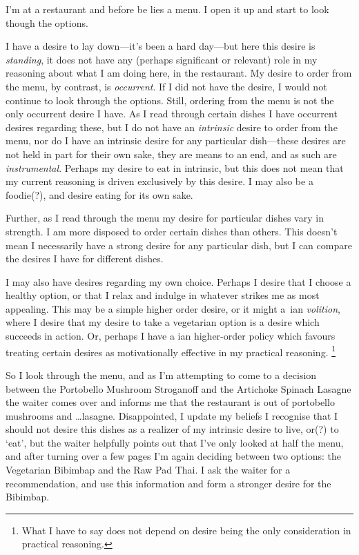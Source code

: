 \documentclass[10pt]{article}
\begin{document}
\begin{scenario}
  I'm at a restaurant and before be lies a menu. I open it up and start to look though the options.

  I have a desire to lay down---it's been a hard day---but here this desire is \emph{standing}, it does not have any (perhaps significant or relevant) role in my reasoning about what I am doing here, in the restaurant. My desire to order from the menu, by contrast, is \emph{occurrent}. If I did not have the desire, I would not continue to look through the options. Still, ordering from the menu is not the only occurrent desire I have.
  As I read through certain dishes I have occurrent desires regarding these, but I do not have an \emph{intrinsic} desire to order from the menu, nor do I have an intrinsic desire for any particular dish---these desires are not held in part for their own sake, they are means to an end, and as such are \emph{instrumental}. Perhaps my desire to eat in intrinsic, but this does not mean that my current reasoning is driven exclusively by this desire. I may also be a foodie(?), and desire eating for its own sake.

  Further, as I read through the menu my desire for particular dishes vary in strength. I am more disposed to order certain dishes than others. This doesn't mean I necessarily have a strong desire for any particular dish, but I can compare the desires I have for different dishes.

  I may also have desires regarding my own choice. Perhaps I desire that I choose a healthy option, or that I relax and indulge in whatever strikes me as most appealing. This may be a simple higher order desire, or it might a~\citeauthor{Frankfurt:1971aa}ian \emph{volition}, where I desire that my desire to take a vegetarian option is a desire which succeeds in action. Or, perhaps I have a \citeauthor{Bratman:2003aa}ian higher-order policy which favours treating certain desires as motivationally effective in my practical reasoning.\nolinebreak
  \footnote{What I have to say does not depend on desire being the only consideration in practical reasoning.}

  So I look through the menu, and as I'm attempting to come to a decision between the Portobello Mushroom Stroganoff and the Artichoke Spinach Lasagne the waiter comes over and informs me that the restaurant is out of portobello mushrooms and \dots lasagne. Disappointed, I update my beliefs I recognise that I should not desire this dishes as a realizer of my intrinsic desire to live, or(?) to `eat', but the waiter helpfully points out that I've only looked at half the menu, and after turning over a few pages I'm again deciding between two options: the Vegetarian Bibimbap and the Raw Pad Thai.
  I ask the waiter for a recommendation, and use this information and form a stronger desire for the Bibimbap.
\end{scenario}
\end{document}
